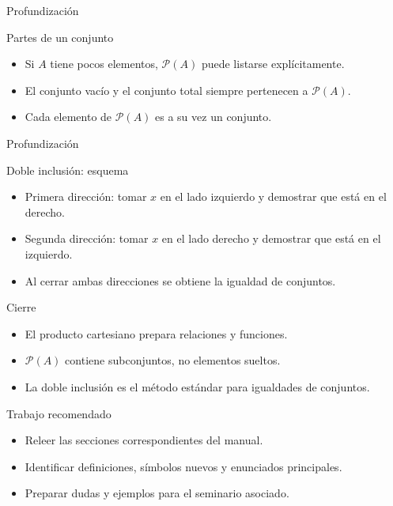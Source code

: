 \documentclass[aspectratio=169,11pt]{beamer}
\begin{document}
\begin{frame}{Profundización}
\begin{block}{Partes de un conjunto}
\begin{itemize}
  \item Si \(A\) tiene pocos elementos, \(\mathcal{P}(A)\) puede listarse explícitamente.
  \item El conjunto vacío y el conjunto total siempre pertenecen a \(\mathcal{P}(A)\).
  \item Cada elemento de \(\mathcal{P}(A)\) es a su vez un conjunto.
\end{itemize}
\end{block}
\end{frame}

\begin{frame}{Profundización}
\begin{block}{Doble inclusión: esquema}
\begin{itemize}
  \item Primera dirección: tomar \(x\) en el lado izquierdo y demostrar que está en el derecho.
  \item Segunda dirección: tomar \(x\) en el lado derecho y demostrar que está en el izquierdo.
  \item Al cerrar ambas direcciones se obtiene la igualdad de conjuntos.
\end{itemize}
\end{block}
\end{frame}

\begin{frame}{Cierre}
\begin{itemize}
  \item El producto cartesiano prepara relaciones y funciones.
  \item \(\mathcal{P}(A)\) contiene subconjuntos, no elementos sueltos.
  \item La doble inclusión es el método estándar para igualdades de conjuntos.
\end{itemize}
\end{frame}

\begin{frame}{Trabajo recomendado}
\begin{itemize}
  \item Releer las secciones correspondientes del manual.
  \item Identificar definiciones, símbolos nuevos y enunciados principales.
  \item Preparar dudas y ejemplos para el seminario asociado.
\end{itemize}
\end{frame}
\end{document}
